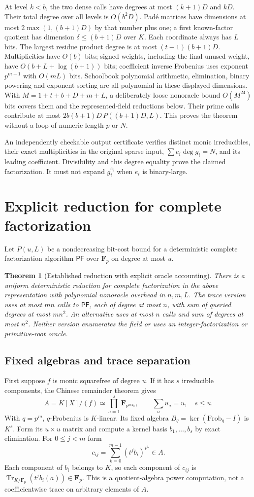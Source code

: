 \documentclass[11pt]{article}
\newcommand{\Fp}{\mathbf F_p}
\newcommand{\Tr}{\operatorname{Tr}}
\newcommand{\PF}{\mathsf{PF}}
\newtheorem{theorem}{Theorem}
\begin{document}
At level $k<b$, the two dense calls have degrees at most $(k+1)D$ and
$kD$. Their total degree over all levels is $O(b^2D)$.
Pad\'e matrices have dimensions at most $2\max(1,(b+1)D)$ by that
number plus one; a first known-factor quotient has dimension
$\delta\le(b+1)D$ over $K$. Each coordinate always has $L$ bits.
The largest residue product degree is at most $(t-1)(b+1)D$.
Multiplicities have $O(b)$ bits; signed weights, including the final unused
weight, have $O(b+L+\log(b+1))$ bits;
coefficient inverse Frobenius uses exponent $p^{m-1}$ with $O(mL)$ bits.
Schoolbook polynomial arithmetic, elimination, binary powering and exponent
sorting are all polynomial in these displayed dimensions. With
$M=1+t+b+D+m+L$, a deliberately loose nonoracle bound $O(M^{24})$
bits covers them and the represented-field reductions below. Their prime
calls contribute at most $2b(b+1)D\,P((b+1)D,L)$.
This proves the theorem without a loop of numeric length $p$ or $N$.

An independently checkable output certificate verifies distinct monic
irreducibles, their exact multiplicities in the original sparse input,
$\sum e_i\deg g_i=N$, and its leading coefficient. Divisibility and this
degree equality prove the claimed factorization. It must not expand
$g_i^{e_i}$ when $e_i$ is binary-large.

\section{Explicit reduction for complete factorization}
Let $P(u,L)$ be a nondecreasing bit-cost bound for a deterministic complete
factorization algorithm $\PF$ over $\Fp$ on degree at most $u$.

\begin{theorem}[Established reduction with explicit oracle accounting]
There is a uniform deterministic reduction for complete factorization
in the above representation with polynomial nonoracle overhead in $n,m,L$.
The trace version uses at most $mn$ calls to $\PF$, each of degree at most
$n$, with sum of queried degrees at most $mn^2$.
An alternative uses at most $n$ calls and sum of degrees at most $n^2$.
Neither version enumerates the field or uses an integer-factorization
or primitive-root oracle.
\end{theorem}

\subsection{Fixed algebras and trace separation}
First suppose $f$ is monic squarefree of degree $u$. If it has $s$
irreducible components, the Chinese remainder theorem gives
\[
 A=K[X]/(f)\simeq\prod_{a=1}^s\mathbf F_{p^{m u_a}},\qquad
 \sum_a u_a=u,\quad s\le u.
\]
With $q=p^m$, $q$-Frobenius is $K$-linear. Its fixed algebra
$B_q=\ker(\mathrm{Frob}_q-I)$ is $K^s$. Form its $u\times u$ matrix
and compute a kernel basis $b_1,\ldots,b_s$ by exact elimination.
For $0\le j<m$ form
\[
 c_{ij}=\sum_{k=0}^{m-1}(t^j b_i)^{p^k}\in A.
\]
Each component of $b_i$ belongs to $K$, so each component of $c_{ij}$
is $\Tr_{K/\Fp}(t^j b_i(a))\in\Fp$. This is a quotient-algebra
power computation, not a coefficientwise trace on arbitrary elements of $A$.
\end{document}
